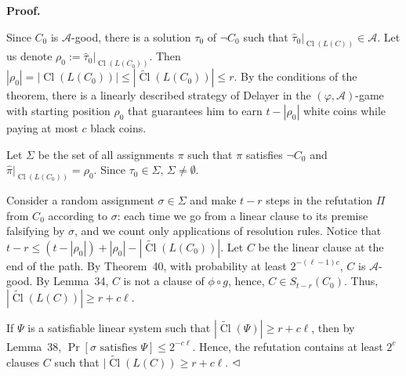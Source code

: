 \documentclass[10pt,a4paper]{article}
\begin{document}
\par\medskip\noindent\textbf{
Proof.}\par


Since $C_{0}$ is $\mathcal{A}$-good, there is a solution $\tau_{0}$ of $\lnot C_{0}$ such that $\hat{\tau}_{0}|_{\mathop{\mathrm{Cl}}(L(C))}\in\mathcal{A}$. Let us denote $\rho_{0}:=\hat{\tau}_{0}|_{\mathop{\mathrm{Cl}}(L(C_{0}))}$.
Then $|\rho_{0}|=|\mathop{\mathrm{Cl}}(L(C_{0}))|\leq|\widetilde{\mathop{\mathrm{Cl}}}(L(C_{0}))|\leq r$.
By the conditions of the theorem, there is a linearly described strategy of Delayer in the $(\varphi,\mathcal{A})$-game with starting position $\rho_{0}$ that guarantees him to earn $t-|\rho_{0}|$ white coins while paying at most $c$ black coins.\par



Let $\Sigma$ be the set of all assignments $\pi$ such that $\pi$ satisfies $\lnot C_{0}$ and $\hat{\pi}|_{\mathop{\mathrm{Cl}}(L(C_{0}))}=\rho_{0}$. Since $\tau_{0}\in\Sigma$, $\Sigma\neq\emptyset$.\par



Consider a random assignment $\sigma\in\Sigma$ and make $t-r$ steps in the refutation $\Pi$
from $C_{0}$ according to $\sigma$: each time we go from a linear clause to its premise falsifying by $\sigma$, and we count only applications of resolution rules. Notice that $t-r\leq(t-|\rho_{0}|)+|\rho_{0}|-|\widetilde{\mathop{\mathrm{Cl}}}(L(C_{0}))|$. Let $C$ be the linear clause at the end of the path.
By Theorem 40,
with probability at least $2^{-(\ell-1)c}$, $C$ is $\mathcal{A}$-good. By Lemma 34, $C$ is not a clause of $\phi\circ g$, hence, $C\in S_{t-r}(C_{0})$. Thus, $|\widetilde{\mathop{\mathrm{Cl}}}(L(C))|\geq r+c\ell$.\par



If $\Psi$ is a satisfiable linear system such that $|\widetilde{\mathop{\mathrm{Cl}}}(\Psi)|\geq r+c\ell$, then by Lemma 38, $\Pr[\mbox{$\sigma$ satisfies $\Psi$}]\leq 2^{-c\ell}$. Hence, the refutation contains at least $2^{c}$ clauses $C$ such that $|\widetilde{\mathop{\mathrm{Cl}}}(L(C))\geq r+c\ell$.
$\hfill\vartriangleleft$\par
\end{document}
